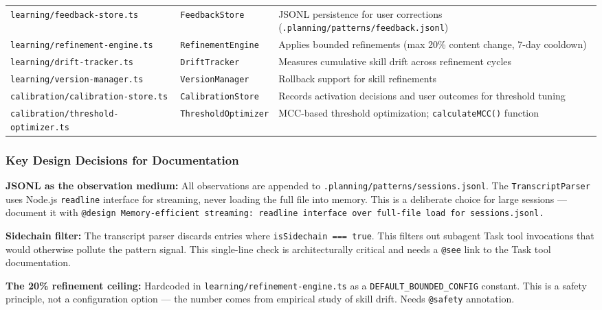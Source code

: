 \documentclass[11pt,letterpaper]{article}
\begin{document}
\begin{center}
\begin{tabularx}{\textwidth}{L{4.5cm}L{4cm}X}
\texttt{learning/feedback-store.ts} & \texttt{FeedbackStore} & JSONL persistence for user corrections (\texttt{.planning/patterns/feedback.jsonl}) \\
\texttt{learning/refinement-engine.ts} & \texttt{RefinementEngine} & Applies bounded refinements (max 20\% content change, 7-day cooldown) \\
\texttt{learning/drift-tracker.ts} & \texttt{DriftTracker} & Measures cumulative skill drift across refinement cycles \\
\texttt{learning/version-manager.ts} & \texttt{VersionManager} & Rollback support for skill refinements \\
\texttt{calibration/calibration-store.ts} & \texttt{CalibrationStore} & Records activation decisions and user outcomes for threshold tuning \\
\texttt{calibration/threshold-optimizer.ts} & \texttt{ThresholdOptimizer} & MCC-based threshold optimization; \texttt{calculateMCC()} function \\
\bottomrule
\end{tabularx}
\end{center}

\subsubsection{Key Design Decisions for Documentation}

\textbf{JSONL as the observation medium:} All observations are appended to \texttt{.planning/patterns/sessions.jsonl}. The \texttt{TranscriptParser} uses Node.js \texttt{readline} interface for streaming, never loading the full file into memory. This is a deliberate choice for large sessions --- document it with \texttt{@design Memory-efficient streaming: readline interface over full-file load for sessions.jsonl.}

\textbf{Sidechain filter:} The transcript parser discards entries where \texttt{isSidechain === true}. This filters out subagent Task tool invocations that would otherwise pollute the pattern signal. This single-line check is architecturally critical and needs a \texttt{@see} link to the Task tool documentation.

\textbf{The 20\% refinement ceiling:} Hardcoded in \texttt{learning/refinement-engine.ts} as a \texttt{DEFAULT\_BOUNDED\_CONFIG} constant. This is a safety principle, not a configuration option --- the number comes from empirical study of skill drift. Needs \texttt{@safety} annotation.
\end{document}
